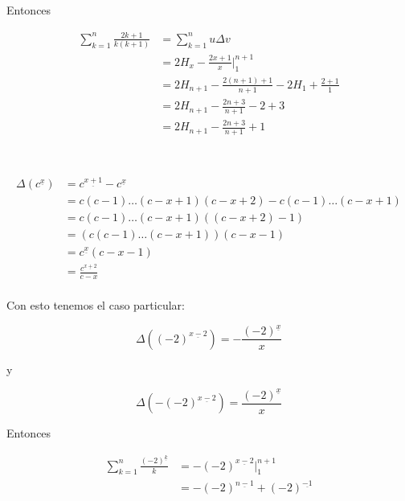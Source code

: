 \documentclass{article}
\begin{document}
Entonces

\begin{align*}
\sum_{k=1}^n \frac{2k+1}{k(k+1)} & = \sum_{k=1}^n u \Delta v \\
             & = 2H_x -\frac{2x+1}{x} \Big |_{1}^{n+1} \\
             & = 2H_{n+1} -\frac{2(n+1)+1}{n+1} - 2H_1 + \frac{2+1}{1} \\
             & = 2H_{n+1} -\frac{2n+3}{n+1} - 2 + 3 \\
             & = 2H_{n+1} -\frac{2n+3}{n+1} + 1 \\
\end{align*}

\section{} %

\begin{align*}
\Delta(c^{\underline{x}}) & = c^{\underline{x+1}} - c^{\underline{x}} \\
  & = c(c-1) \ldots (c-x+1)(c-x+2) - c(c-1) \ldots (c-x+1) \\
  & = c(c-1) \ldots (c-x+1)((c-x+2)-1) \\
  & = (c(c-1) \ldots (c-x+1))(c-x-1) \\
  & = c^{\underline{x}}(c-x-1) \\
  & = \frac{c^{\underline{x+2}}}{c-x} \\
\end{align*}

Con esto tenemos el caso particular:

$$
\Delta((-2)^{\underline{x-2}}) = -\frac{(-2)^{\underline{x}}}{x}
$$

y

$$
\Delta(-(-2)^{\underline{x-2}}) = \frac{(-2)^{\underline{x}}}{x}
$$

Entonces

\begin{align*}
\sum_{k=1}^n \frac{(-2)^{\underline{k}}}{k} & = -(-2)^{\underline{x-2}} \Big |_{1}^{n+1} \\
  & = - (-2)^{\underline{n-1}} + (-2)^{\underline{-1}} \\
\end{align*}

\section{} %
\end{document}
